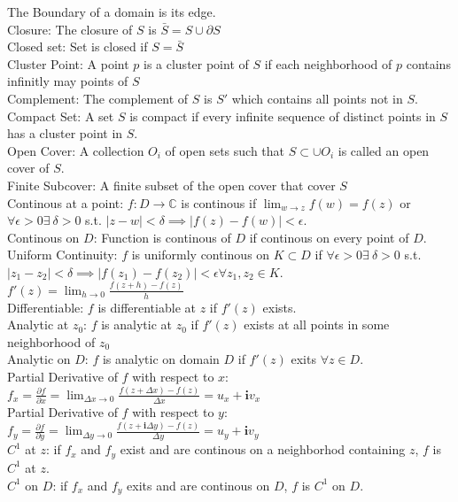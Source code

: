 \documentclass{article}%
\newcommand\abs[1]{\left|#1\right|}
\newcommand\I{\textbf{i}}
\begin{document}
The Boundary of a domain is its edge.  \\
Closure: The closure of $S$ is $\bar{S}=S\cup \partial S$ \\
Closed set: Set is closed if $S=\bar{S}$ \\
Cluster Point: A point $p$ is a cluster point of $S$ if each neighborhood of $p$ contains infinitly may points of $S$ \\
Complement: The complement of $S$ is $S'$ which contains all points not in $S$. \\
Compact Set: A set $S$ is compact if every infinite sequence of distinct points in $S$ has a cluster point in $S$. \\
Open Cover: A collection ${O_i}$ of open sets such that $S \subset \cup O_i$ is called an open cover of $S$. \\
Finite Subcover: A finite subset of the open cover that cover $S$  \\
Continous at a point: $f:D\to\mathbb{C}$ is continous if $\lim_{w\to z}f(w)=f(z)$ or $\forall \epsilon>0 \exists\ \delta >0$ s.t. $\abs{z-w}< \delta \implies \abs{f(z)-f(w)}<\epsilon$. \\
Continous on $D$: Function is continous of $D$ if continous on every point of $D$. \\
Uniform Continuity: $f$ is uniformly continous on $K\subset D$ if $\forall \epsilon>0 \exists\ \delta >0$ s.t. $\abs{z_1-z_2}< \delta \implies \abs{f(z_1)-f(z_2)}<\epsilon \forall z_1, z_2 \in K$. \\
$f'(z) = \lim_{h\to 0} \frac{f(z+h)-f(z)}{h} $ \\
Differentiable: $f$ is differentiable at $z$ if $f'(z)$ exists. \\
Analytic at $z_0$: $f$ is analytic at $z_0$ if $f'(z)$ exists at all points in some neighborhood of $z_0$ \\
Analytic on $D$: $f$ is analytic on domain $D$ if $f'(z)$ exits $\forall z\in D$. \\
Partial Derivative of $f$ with respect to $x$: $f_x = \frac{\partial f}{\partial x}=\lim_{\Delta x \to 0} \frac{f(z+\Delta x)-f(z)}{\Delta x} = u_x + \I v_x $\\
Partial Derivative of $f$ with respect to $y$: $f_y = \frac{\partial f}{\partial y}=\lim_{\Delta y \to 0} \frac{f(z+\I \Delta y)-f(z)}{\Delta y} = u_y + \I v_y$ \\
$C^1$ at $z$: if $f_x$ and $f_y$ exist and are continous on a neighborhod containing $z$, $f$ is $C^1$ at $z$. \\
$C^1$ on $D$: if $f_x$ and $f_y$ exits and are continous on $D$, $f$ is $C^1$ on $D$. \\
\end{document}
